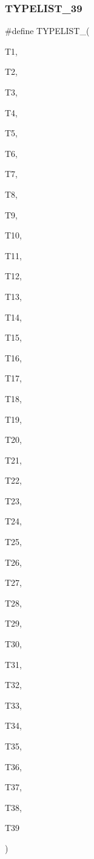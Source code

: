 \subsubsection{\texorpdfstring{TYPELIST\_39}{TYPELIST\_39}}
{\footnotesize\ttfamily \#define T\+Y\+P\+E\+L\+I\+S\+T\+\_(\begin{DoxyParamCaption}\item[{}]{T1,  }\item[{}]{T2,  }\item[{}]{T3,  }\item[{}]{T4,  }\item[{}]{T5,  }\item[{}]{T6,  }\item[{}]{T7,  }\item[{}]{T8,  }\item[{}]{T9,  }\item[{}]{T10,  }\item[{}]{T11,  }\item[{}]{T12,  }\item[{}]{T13,  }\item[{}]{T14,  }\item[{}]{T15,  }\item[{}]{T16,  }\item[{}]{T17,  }\item[{}]{T18,  }\item[{}]{T19,  }\item[{}]{T20,  }\item[{}]{T21,  }\item[{}]{T22,  }\item[{}]{T23,  }\item[{}]{T24,  }\item[{}]{T25,  }\item[{}]{T26,  }\item[{}]{T27,  }\item[{}]{T28,  }\item[{}]{T29,  }\item[{}]{T30,  }\item[{}]{T31,  }\item[{}]{T32,  }\item[{}]{T33,  }\item[{}]{T34,  }\item[{}]{T35,  }\item[{}]{T36,  }\item[{}]{T37,  }\item[{}]{T38,  }\item[{}]{T39 }\end{DoxyParamCaption})}


